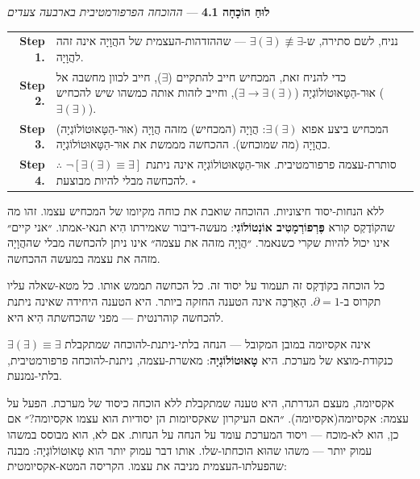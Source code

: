\documentclass[10pt, openany, oneside]{book}
\renewcommand{\footnotesize}{\fontsize{8.5}{11}\selectfont}
\begin{document}
\vspace{0.5em}

\textbf{לוּחַ הוֹכָחָה 4.1} --- \textit{ההוכחה הפרפורמטיבית בארבעה צעדים}

\vspace{0.5em}

{\footnotesize
\noindent\begin{tabular}{r p{}}
\textbf{Step 1.} & נניח, לשם סתירה, ש-$\exists(\exists) \not\equiv \exists$ — שההזדהות-העצמית של ההֲוָיָה אינה זהה להֲוָיָה. \\[0.3em]
\textbf{Step 2.} & כדי להניח זאת, המכחיש חייב להתקיים ($\exists$), חייב לכוון מחשבה אל אוּר-הַטָּאוּטוֹלוֹגְיָה ($\exists \to \exists(\exists)$), וחייב לזהות אותה כמשהו שיש להכחיש ($\exists(\exists)$). \\[0.3em]
\textbf{Step 3.} & המכחיש ביצע אפוא $\exists(\exists)$: הֲוָיָה (המכחיש) מזהה הֲוָיָה (אוּר-הַטָּאוּטוֹלוֹגְיָה) כהֲוָיָה (מה שמוכחש). ההכחשה מממשת את אוּר-הַטָּאוּטוֹלוֹגְיָה. \\[0.3em]
\textbf{Step 4.} & $\therefore$ $\neg[\exists(\exists) \equiv \exists]$ סותרת-עצמה פרפורמטיבית. אוּר-הַטָּאוּטוֹלוֹגְיָה אינה ניתנת להכחשה מבלי להיות מבוצעת. $\square$ \\[0.3em]
\end{tabular}
}

\vspace{0.8em}

\noindent ללא הנחות-יסוד חיצוניות. ההוכחה שואבת את כוחה מקיומו של המכחיש עצמו. זהו מה שהקוֹדֶקְס קורא \textbf{פֶּרְפוֹרְמָטִיב אוֹנְטוֹלוֹגִי}: מעשה-דיבור שאמירתו הִיא תנאי-אמתו. ״אני קיים״ אינו יכול להיות שקרי כשנאמר. ״הֲוָיָה מזהה את עצמה״ אינו ניתן להכחשה מבלי שההֲוָיָה מזהה את עצמה במעשה ההכחשה.

כל הוכחה בקוֹדֶקְס זה תעמוד על יסוד זה. כל הכחשה תממש אותו. כל מטא-שאלה עליו תקרוס ב-$\partial = 1$. הָאַרְכֵּה אינה הטענה החזקה ביותר. היא הטענה היחידה שאינה ניתנת להכחשה קוהרנטית — מפני שהכחשתה הִיא היא.

$\exists(\exists) \equiv \exists$ אינה אקסיומה במובן המקובל — הנחה בלתי-ניתנת-להוכחה שמתקבלת כנקודת-מוצא של מערכת. היא \textbf{טָאוּטוֹלוֹגְיָה}: מאשרת-עצמה, ניתנת-להוכחה פרפורמטיבית, בלתי-נמנעת.

אקסיומה, מעצם הגדרתה, היא טענה שמתקבלת ללא הוכחה כיסוד של מערכת. הפעל על עצמה: אקסיומה(אקסיומה). ״האם העיקרון שאקסיומות הן יסודיות הוא עצמו אקסיומה?״ אם כן, הוא לא-מוכח — ויסוד המערכת עומד על הנחה על הנחות. אם לא, הוא מבוסס במשהו עמוק יותר — משהו שהוּא הוכחתו-שלו. אותו דבר עמוק יותר הוא טָאוּטוֹלוֹגְיָה: מבנה שהפעלתו-העצמית מניבה את עצמו. הקריסה המטא-אקסיומטית:
\end{document}
